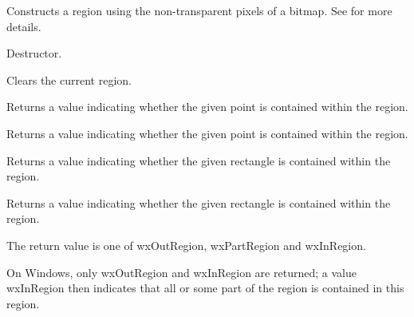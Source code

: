 

Constructs a region using the non-transparent pixels of a bitmap.  See
 for more details.



\label{wxregiondtor}


Destructor.


\label{wxregionclear}


Clears the current region.


\label{wxregioncontains}


Returns a value indicating whether the given point is contained within the region.


Returns a value indicating whether the given point is contained within the region.


Returns a value indicating whether the given rectangle is contained within the region.


Returns a value indicating whether the given rectangle is contained within the region.


The return value is one of wxOutRegion, wxPartRegion and wxInRegion.

On Windows, only wxOutRegion and wxInRegion are returned; a value wxInRegion then indicates that
all or some part of the region is contained in this region.


\label{wxregionconverttobitmap}


